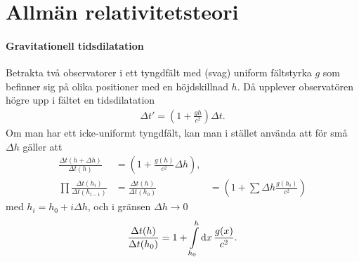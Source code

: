 \section{Allmän relativitetsteori}

\paragraph{Gravitationell tidsdilatation}
Betrakta två observatorer i ett tyngdfält med (svag) uniform fältstyrka $g$ som befinner sig på olika positioner med en höjdskillnad $h$. Då upplever observatören högre upp i fältet en tidsdilatation
\begin{align*}
	\Delta t' = (1 + \frac{gh}{c^{2}})\Delta t.
\end{align*}
Om man har ett icke-uniformt tyngdfält, kan man i stället använda att för små $\Delta h$ gäller att
\begin{align*}
	\frac{\Delta t(h + \Delta{h})}{\Delta t(h)}       &= (1 + \frac{g(h)}{c^{2}}\Delta{h}), \\
	\prod\frac{\Delta t(h_{i})}{\Delta t(h_{i - 1})}  &= \frac{\Delta t(h)}{\Delta t(h_{0})} &= (1 + \sum\Delta{h}\frac{g(h_{i})}{c^{2}})
\end{align*}
med $h_{i} = h_{0} + i\Delta{h}$, och i gränsen $\Delta h\to 0$
\begin{align*}
	\frac{\Delta t(h)}{\Delta t(h_{0})} = 1 + \int\limits_{h_{0}}^{h}\dd{x}\frac{g(x)}{c^{2}}.
\end{align*}